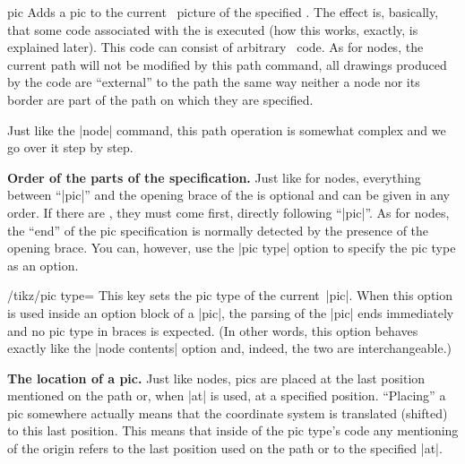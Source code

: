\begin{pathoperation}{pic}{
}
    Adds a pic to the current \tikzname\ picture of the specified . The effect is, basically, that some code associated with the
     is executed (how this works, exactly, is explained later).
    This code can consist of arbitrary \tikzname\ code. As for nodes, the
    current path will not be modified by this path command, all drawings
    produced by the code are ``external'' to the path the same way neither a
    node nor its border are part of the path on which they are specified.

    Just like the |node| command, this path operation is somewhat complex and
    we go over it step by step.

    \medskip
    \textbf{Order of the parts of the specification.}
    Just like for nodes, everything between ``|pic|'' and the opening brace of
    the  is optional and can be given in any order. If there are
    , they must come first, directly following
    ``|pic|''. As for nodes, the ``end'' of the pic specification is normally
    detected by the presence of the opening brace. You can, however, use the
    |pic type| option to specify the pic type as an option.

    \begin{key}{/tikz/pic type=}
        This key sets the pic type of the current~|pic|. When this option is
        used inside an option block of a |pic|, the parsing of the |pic| ends
        immediately and no pic type in braces is expected. (In other words,
        this option behaves exactly like the |node contents| option and,
        indeed, the two are interchangeable.)
\begin{codeexample}[]
\end{codeexample}
    \end{key}

    \medskip
    \textbf{The location of a pic.}
    Just like nodes, pics are placed at the last position mentioned on the path
    or, when |at| is used, at a specified position. ``Placing'' a pic somewhere
    actually means that the coordinate system is translated (shifted) to this
    last position. This means that inside of the pic type's code any mentioning
    of the origin refers to the last position used on the path or to the
    specified |at|.
\begin{codeexample}[]
\end{codeexample}


\end{pathoperation}
